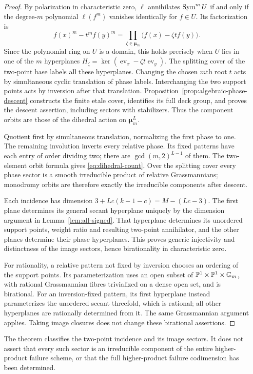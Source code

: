 \begin{proof}
By polarization in characteristic zero, $\ell$ annihilates
$\operatorname{Sym}^mU$ if and only if the degree-$m$ polynomial $\ell(f^m)$
vanishes identically for $f\in U$. Its factorization is
\[
 f(x)^m-t^mf(y)^m
 =\prod_{\zeta\in\boldsymbol\mu_m}
                \bigl(f(x)-\zeta t f(y)\bigr).
\]
Since the polynomial ring on $U$ is a domain, this holds precisely when
$U$ lies in one of the $m$ hyperplanes
$H_\zeta=\ker(\operatorname{ev}_x-\zeta t\operatorname{ev}_y)$.
The splitting cover of the two-point base labels all these hyperplanes.
Changing the chosen $m$th root $t$ acts by simultaneous cyclic
translation of phase labels. Interchanging the two support points acts
by inversion after that translation. Proposition~\ref{prop:algebraic-phase-descent} constructs the finite
etale cover, identifies its full deck group, and proves the descent
assertion, including sectors with stabilizers. Thus the component
orbits are those of the dihedral action on $\boldsymbol\mu_m^L$.

Quotient first by simultaneous translation, normalizing the first phase
to one. The remaining involution inverts every relative phase. Its fixed
patterns have each entry of order dividing two; there are
$\gcd(m,2)^{L-1}$ of them. The two-element orbit formula gives
\eqref{eq:dihedral-count}. Over the splitting cover every phase sector
is a smooth irreducible product of relative Grassmannians; monodromy
orbits are therefore exactly the irreducible components after descent.

Each incidence has dimension $3+Lc(k-1-c)=M-(Lc-3)$.
The first plane determines its general secant hyperplane uniquely by
the dimension argument in Lemma~\ref{lem:all-signed}. That hyperplane
determines its unordered support points, weight ratio and resulting
two-point annihilator, and the other planes determine their phase
hyperplanes. This proves generic injectivity and distinctness of the
image sectors, hence birationality in characteristic zero.

For rationality, a relative pattern not fixed by inversion chooses an
ordering of the support points. Its parameterization uses an open
subset of $\mathbb P^1\times\mathbb P^1\times\mathbb G_m$, with rational
Grassmannian fibres trivialized on a dense open set, and is birational.
For an inversion-fixed pattern, its first hyperplane instead
parameterizes the unordered secant threefold, which is rational; all
other hyperplanes are rationally determined from it. The same
Grassmannian argument applies. Taking image closures does not change
these birational assertions.
\end{proof}
The theorem classifies the two-point incidence and its image sectors.
It does not assert that every such sector is an irreducible component
of the entire higher-product failure scheme, or that the full
higher-product failure codimension has been determined.

